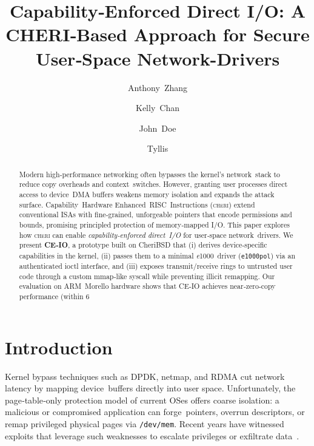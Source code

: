 \documentclass[sigconf]{acmart}
\title{Capability‑Enforced Direct I/O: A CHERI‑Based Approach for Secure User‑Space Network-Drivers}
\author{Anthony Zhang}
\affiliation{\institution{Northwestern University}\country{USA}}
\author{Kelly Chan}
\affiliation{\institution{Northwestern University}\country{USA}}
\author{John Doe}
\affiliation{\institution{Northwestern University}\country{USA}}
\author{Tyllis}
\affiliation{\institution{Northwestern University}\country{USA}}
\newcommand{\cheri}{\textsc{cheri}\xspace}
\newcommand{\e}{\textit{e}1000\xspace}
\begin{document}
\begin{abstract}
Modern high‑performance networking often bypasses the kernel’s network stack to reduce copy overheads and context switches. However, granting user processes direct access to device DMA buffers weakens memory isolation and expands the attack surface. Capability Hardware Enhanced RISC Instructions (\cheri) extend conventional ISAs with fine‑grained, unforgeable pointers that encode permissions and bounds, promising principled protection of memory‑mapped I/O. This paper explores how \cheri can enable \emph{capability‑enforced direct I/O} for user‑space network drivers.
We present \textbf{CE‑IO}, a prototype built on CheriBSD that (i) derives device‑specific capabilities in the kernel, (ii) passes them to a minimal \e driver (\texttt{e1000pol}) via an authenticated ioctl interface, and (iii) exposes transmit/receive rings to untrusted user code through a custom mmap‑like syscall while preventing illicit remapping. Our evaluation on ARM Morello hardware shows that CE‑IO achieves near‑zero‑copy performance (within 6 %
\end{abstract}

\maketitle
\tableofcontents
\newpage





\section{Introduction}
\label{sec:intro}
Kernel bypass techniques such as DPDK, netmap, and RDMA cut network latency by mapping device buffers directly into user space. Unfortunately, the page‑table‑only protection model of current OSes offers coarse isolation: a malicious or compromised application can forge pointers, overrun descriptors, or remap privileged physical pages via \texttt{/dev/mem}. Recent years have witnessed exploits that leverage such weaknesses to escalate privileges or exfiltrate data \cite{netmapCVE}.  
\end{document}
